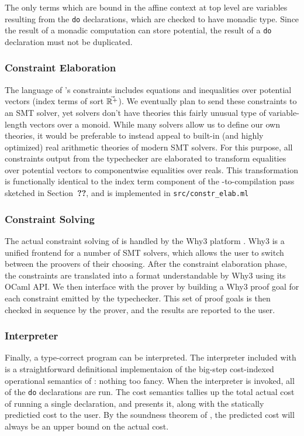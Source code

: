 The only terms which are bound in the affine context at top level are variables resulting from the \texttt{do} declarations, which are checked to have monadic type. Since the result of a monadic computation can store potential, the result of a \texttt{do} declaration must not be duplicated.

\subsubsection{Constraint Elaboration}
The language of \dlambdaamor's constraints includes equations and inequalities over potential vectors (index terms of sort $\vec{\mathbb{R}^+}$). We eventually plan to send these constraints to an SMT solver, yet solvers don't have theories this fairly unusual type of variable-length vectors over a monoid. While many solvers allow us to define our own theories, it would be preferable to instead appeal to built-in (and highly optimized) real arithmetic theories of modern SMT solvers. For this purpose, all constraints output from the typechecker are elaborated to transform equalities over potential vectors to componentwise equalities over reals. This transformation is functionally identical to the index term component of the \dlambdaamor-to-\lambdaamor compilation pass sketched in Section~\textbf{??}, and is implemented in \texttt{src/constr_elab.ml}

\subsubsection{Constraint Solving}
The actual constraint solving of \lambdaamorimpl is handled by the Why3 platform \citehere. Why3 is a unified frontend for a number of SMT solvers, which allows the user to switch between the proovers of their choosing. After the constraint elaboration phase, the constraints are translated into a format understandable by Why3 using its OCaml API. We then interface with the prover by building a Why3 proof goal for each constraint emitted by the typechecker. This set of proof goals is then checked in sequence by the prover, and the results are reported to the user.

\subsubsection{Interpreter}
Finally, a type-correct program can be interpreted. The interpreter included with \lambdaamorimpl is a straightforward definitional implementaion of the big-step cost-indexed operational semantics of \dlambdaamor: nothing too fancy. When the interpreter is invoked, all of the \texttt{do} declarations are run. The cost semantics tallies up the total actual cost of running a single declaration, and presents it, along with the statically predictied cost to the user. By the soundness theorem of \dlambdaamor, the predicted cost will always be an upper bound on the actual cost.

